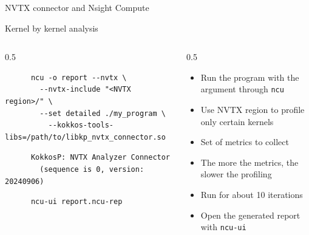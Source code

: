 \begin{frame}[fragile]{NVTX connector and Nsight Compute}

  Kernel by kernel analysis
  \vspace{5pt}

  \begin{columns}
    \begin{column}{0.5\linewidth}
      \begin{verbatim}
      ncu -o report --nvtx \
        --nvtx-include "<NVTX region>/" \
        --set detailed ./my_program \
          --kokkos-tools-libs=/path/to/libkp_nvtx_connector.so
      \end{verbatim}
      \vspace{5pt}
      \begin{verbatim}
      KokkosP: NVTX Analyzer Connector
        (sequence is 0, version: 20240906)
      \end{verbatim}
      \vspace{5pt}
      \begin{verbatim}
      ncu-ui report.ncu-rep
      \end{verbatim}
    \end{column}
    \begin{column}{0.5\linewidth}
      \begin{itemize}
        \item Run the program with the argument through \texttt{ncu}
        \item Use NVTX region to profile only certain kernels
        \item Set of metrics to collect
        \item The more the metrics, the slower the profiling
        \item Run for about 10 iterations
        \item Open the generated report with \texttt{ncu-ui}
      \end{itemize}
    \end{column}
  \end{columns}

\end{frame}


